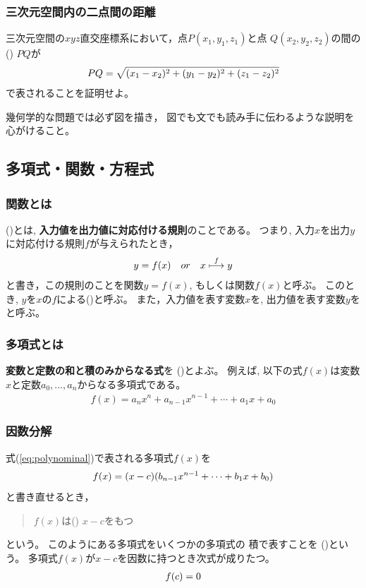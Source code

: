 \documentclass[twocolumn,11pt]{jarticle}
\begin{document}
\subsubsection{三次元空間内の二点間の距離}
三次元空間の$xyz$直交座標系において，点$P(x_1,y_1,z_1)$と点
$Q(x_2,y_2,z_2)$の間の()
$PQ$が
\begin{align}
 PQ=\sqrt{(x_1-x_2)^2+(y_1-y_2)^2+(z_1-z_2)^2} \notag
\end{align}
で表されることを証明せよ。

\comment
幾何学的な問題では必ず図を描き，
図でも文でも読み手に伝わるような説明を心がけること。

\subsection{多項式・関数・方程式}

\subsubsection{関数とは}
()とは,
\textbf{入力値を出力値に対応付ける規則}のことである。
つまり, 入力$x$を出力$y$に対応付ける規則$f$が与えられたとき，
\begin{align}
  y=f(x)\quad or\quad x \overset{f}{\longmapsto} y\notag
\end{align}
と書き，この規則のことを関数$y=f(x)$, もしくは関数$f(x)$と呼ぶ。
このとき, $y$を$x$の$f$による()と呼ぶ。
また，入力値を表す変数$x$を,
出力値を表す変数$y$をと呼ぶ。


\subsubsection{多項式とは}
\textbf{変数と定数の和と積のみからなる式}を
()とよぶ。
例えば, 以下の式$f(x)$は変数$x$と定数$a_0,\ldots,a_n$からなる多項式である。
\begin{align}
  \label{eq:polynominal}
  f(x)=a_nx^n+a_{n-1}x^{n-1}+\cdots+a_1x+a_0
\end{align}

\subsubsection{因数分解}
式(\ref{eq:polynominal})で表される多項式$f(x)$を
\begin{align}
f(x)=(x-c)(b_{n-1}x^{n-1}+\cdots+b_1x+b_0) \notag
\end{align}
と書き直せるとき，
\begin{quote}
$f(x)$は()
$x-c$をもつ
\end{quote}
という。
このようにある多項式をいくつかの多項式の
積で表すことを
  ()という。
多項式$f(x)$が$x-c$を因数に持つとき次式が成りたつ。
\begin{align}
  f(c)=0  \notag
\end{align}
\end{document}
